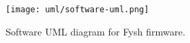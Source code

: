 \begin{figure}[h]
	\centering
	\texttt{[image: uml/software-uml.png]}
	\caption{Software UML diagram for Fysh firmware.}
	\label{fig:deployment}
\end{figure}